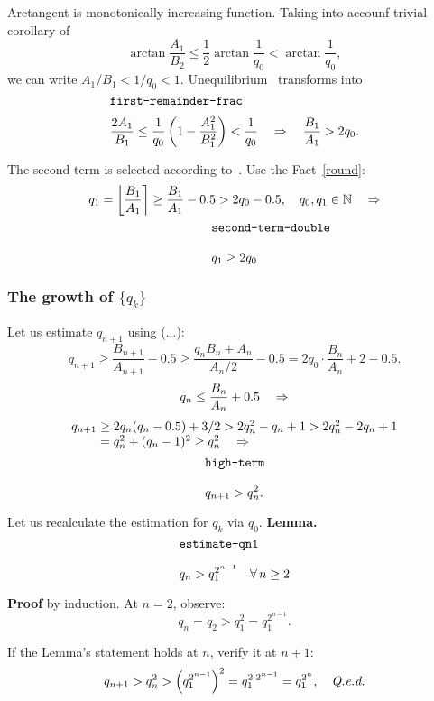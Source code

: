 \documentclass[draft, 11pt]{article} %
\def\fact#1{Fact~\ref{#1}}
\begin{document}
Arctangent is monotonically increasing function.
Taking into accounf trivial corollary of~
$$
\arctan \dfrac{A_1}{B_2} \le \dfrac{1}{2} \arctan \dfrac{1}{q_0} < \arctan \dfrac{1}{q_0},
$$
we can write $A_1/B_1 < 1/q_0 < 1$. Unequilibrium~ transforms into
%
\begin{equation}\mlabel{first-remainder-frac}
\dfrac{2A_1}{B_1} \le \dfrac{1}{q_0} \left( 1 - \dfrac{A_1^2}{B_1^2} \right) < \dfrac{1}{q_0}
    \quad\ergo\quad \dfrac{B_1}{A_1} > 2 q_0.
\end{equation}

The second term is selected according to~. Use the \fact{round}:
$$
q_1 = \nround{ \dfrac{B_1}{A_1} } \ge \dfrac{B_1}{A_1} - 0.5 > 2 q_0 - 0.5,
    \quad q_0, q_1 \in \N \quad\ergo
$$
\begin{equation}\mlabel{second-term-double}
q_1 \ge 2 q_0
\end{equation}

\subsubsection{The growth of $\{ q_k \}$}

Let us estimate $q_{n+1}$ using (...):
$$
q_{n+1} \ge \dfrac{B_{n+1}}{A_{n+1}} - 0.5 \ge \dfrac{q_n B_n + A_n}{A_n / 2} - 0.5
    = 2 q_0 \cdot \dfrac{B_n}{A_n} + 2 - 0.5.
$$
$$
q_n \le \dfrac{B_n}{A_n} + 0.5 \quad\ergo %
$$
$$
\begin{array}{l}
q_{n+1} \ge 2 q_n ( q_n - 0.5 ) + 3/2 > 2 q_n^2 - q_n + 1 > 2 q_n^2 - 2 q_n + 1 \\
\phantom{q_{n+1}} = q_n^2 + (q_n - 1)^2 \ge q_n^2 \quad\ergo
\end{array}
$$
\begin{equation}\mlabel{high-term}
q_{n+1} > q_n^2.
\end{equation}

Let us recalculate the estimation for $q_k$ via $q_0$.
{\bf Lemma.\/}
%
\begin{equation}\mlabel{estimate-qn1}
q_n > q_1 ^ {2^{n-1}} \quad \forall\, n \ge 2
\end{equation}

{\bf Proof\/} by induction. At $n=2$, observe:
$$
q_n = q_2 > q_1^2 = q_1^{2^{n-1}}.
$$

If the Lemma's statement holds at $n$, verify it at $n+1$:
$$
q_{n+1} > q_n^2 >\left( q_1^{2^{n-1}} \right)^2 = q_1^{2 \cdot 2^{n-1}} = q_1^{2^n},
    \quad\hbox{\qed}
$$
\end{document}
